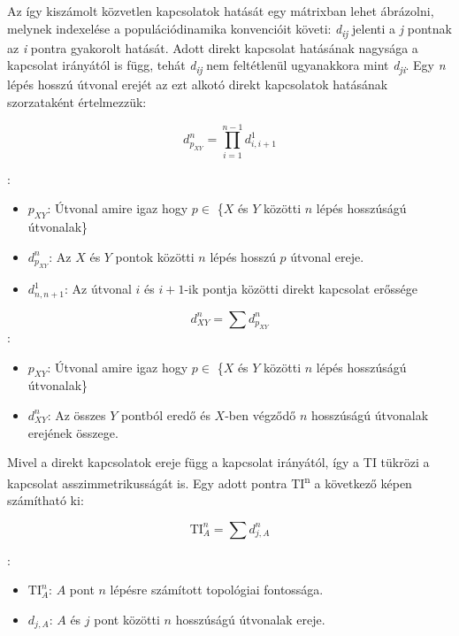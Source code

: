 \documentclass[a4paper,12pt]{article}
\begin{document}
	 Az így kiszámolt közvetlen kapcsolatok hatását egy mátrixban lehet ábrázolni, melynek indexelése a populációdinamika konvencióit követi: \textit{d}\textsubscript{\textit{ij}} jelenti a \textit{j} pontnak az \textit{i} pontra gyakorolt hatását. Adott direkt kapcsolat hatásának nagysága a kapcsolat irányától is függ, tehát \textit{d}\textsubscript{\textit{ij}} nem feltétlenül ugyanakkora mint \textit{d}\textsubscript{\textit{ji}}. Egy \textit{n} lépés hosszú útvonal erejét az ezt alkotó direkt kapcsolatok hatásának szorzataként értelmezzük:

	 \begin{equation}
		d^n_{p_{XY}} =\prod_{i=1}^{n-1} d^1_{i, i+1}
	 \end{equation}


	 :
	 \begin{itemize}[label=]
		 \item $p_{XY}$: Útvonal amire igaz hogy $p \in$ \{$X$ és $Y$ közötti $n$ lépés hosszúságú útvonalak\}
		 \item $d^n_{p_{XY}}$: Az $X$ és $Y$ pontok közötti $n$ lépés hosszú $p$ útvonal ereje.
		 \item $d^1_{n, n+1}$: Az útvonal $i$ és $i+1$-ik pontja közötti direkt kapcsolat erőssége
	 \end{itemize}


	 \begin{equation}
		 d^n_{XY} = \sum d^{n}_{p_{XY}}
	 \end{equation}
	 :
	 \begin{itemize}[label=]
		\item $p_{XY}$: Útvonal amire igaz hogy $p \in$ \{$X$ és $Y$ közötti $n$ lépés hosszúságú útvonalak\}
		\item $d^n_{XY}$: Az összes $Y$ pontból eredő és $X$-ben végződő $n$ hosszúságú útvonalak erejének összege.
	 \end{itemize}

	 Mivel a direkt kapcsolatok ereje függ a kapcsolat irányától, így a TI tükrözi a kapcsolat asszimmetrikusságát is. Egy adott pontra TI\textsuperscript{n} a következő képen számítható ki:

	 \begin{equation}
		\textrm{TI}^n_A=\sum d^n_{j,A}
	 \end{equation}

	 :
	 \begin{itemize}[label=]
		 \item  $\textrm{TI}^n_A$: $A$ pont $n$ lépésre számított topológiai fontossága.
		 \item  $d_{j,A}$: $A$ és $j$ pont közötti $n$ hosszúságú útvonalak ereje.
	 \end{itemize}
\end{document}
